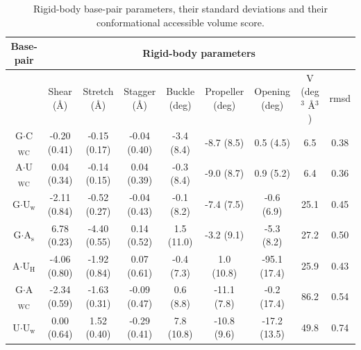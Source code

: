 \begin{table}
\begin{center}
\begin{tabular}{|c|c|c|c|c|c|c|c|c|}
\hline
Base-pair & \multicolumn{8}{c|}{Rigid-body parameters} \\
\hline
 & Shear (\AA) & Stretch (\AA) & Stagger (\AA) & Buckle (deg) &
Propeller (deg) & Opening (deg) & V (deg$^{\text{3}}$
\AA$^{\text{3}}$) & rmsd \\
\hline
G$\cdot$C$_{\text{WC}}$ & -0.20 (0.41) & -0.15 (0.17) & -0.04 (0.40) & -3.4 (8.4)  &  -8.7  (8.5) &  0.5  (4.5)  & 6.5   & 0.38\\
A$\cdot$U$_{\text{WC}}$ &  0.04 (0.34) & -0.14 (0.15) &  0.04 (0.39) & -0.3 (8.4)  &  -9.0  (8.7) &  0.9  (5.2)  & 6.4   & 0.36\\
G$\cdot$U$_{\text{w}}$  & -2.11 (0.84) & -0.52 (0.27) & -0.04 (0.43) & -0.1 (8.2)  &  -7.4  (7.5) & -0.6  (6.9)  & 25.1  & 0.45\\
G$\cdot$A$_{\text{s}}$  &  6.78 (0.23) & -4.40 (0.55) &  0.14 (0.52) &  1.5 (11.0) &  -3.2  (9.1) & -5.3  (8.2)  & 27.2  & 0.50\\
A$\cdot$U$_{\text{H}}$  & -4.06 (0.80) & -1.92 (0.84) &  0.07 (0.61) & -0.4 (7.3)  &   1.0 (10.8) & -95.1 (17.4) & 25.9  & 0.43\\
G$\cdot$A$_{\text{WC}}$ & -2.34 (0.59) & -1.63 (0.31) & -0.09 (0.47) &  0.6 (8.8)  & -11.1  (7.8) & -0.2  (17.4) & 86.2  & 0.54\\
U$\cdot$U$_{\text{w}}$  &  0.00 (0.64) &  1.52 (0.40) & -0.29 (0.41) &  7.8 (10.8) & -10.8  (9.6) & -17.2 (13.5) & 49.8  & 0.74\\
\hline
\end{tabular}
\caption{Rigid-body base-pair parameters, their standard deviations
  and their conformational accessible volume score.}
\label{tab:bppar}
\end{center}
\end{table}




